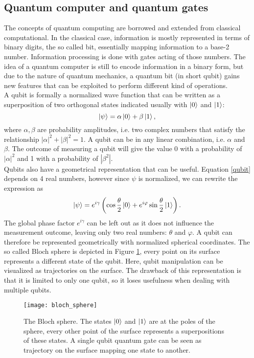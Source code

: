 \subsection{Quantum computer and quantum gates}
\label{sec:quantumoperations}
The concepts of quantum computing are borrowed and extended from classical computational. In the classical case, information is mostly represented in terms of binary digits, the so called bit, essentially mapping information to a base-2 number. Information processing is done with gates acting of those numbers. The idea of a quantum computer is still to encode information in a binary form, but due to the nature of quantum mechanics, a quantum bit (in short qubit) gains new features that can be exploited to perform different kind of operations.\\
A qubit is formally a normalized wave function that can be written as a superposition of two orthogonal states indicated usually with $\ket{0}$ and $\ket{1}$:
\begin{equation}
\label{qubit}
\ket{\psi} = \alpha \ket{0} + \beta\ket{1},
\end{equation}
where $\alpha,\beta$ are probability amplitudes, i.e. two complex numbers that satisfy the relationship $|\alpha|^2+|\beta|^2 = 1$.
A qubit can be in any linear combination, i.e. $\alpha$ and $\beta$. The outcome of measuring a qubit will give the value 0 with a probability of $|\alpha|^2$ and 1 with a probability of $|\beta^2|$.\\
Qubits also have a geometrical representation that can be useful. Equation \eqref{qubit} depends on 4 real numbers, however since $\psi$ is normalized, we can rewrite the expression as
\begin{equation}
\ket{\psi} = e^{i\gamma}\left(\cos\frac{\theta}{2}\ket{0} + e^{i\varphi}\sin\frac{\theta}{2}\ket{1}\right).
\end{equation}
The global phase factor $e^{i\gamma}$ can be left out as it does not influence the measurement outcome, leaving only two real numbers: $\theta$ and $\varphi$. A qubit can therefore be represented geometrically with normalized spherical coordinates. The so called Bloch sphere is depicted in Figure \ref{blochsphere}, every point on its surface represents a different state of the qubit. Here, qubit manipulation can be visualized as trajectories on the surface. The drawback of this representation is that it is limited to only one qubit, so it loses usefulness when dealing with multiple qubits.
\begin{figure}[H]
\centering
\texttt{[image: bloch\_sphere]}
\caption{The Bloch sphere. The states $\ket{0}$ and $\ket{1}$ are at the poles of the sphere, every other point of the surface represents a superpositions of these states. A single qubit quantum gate can be seen as trajectory on the surface mapping one state to another.}
\label{blochsphere}
\end{figure}

